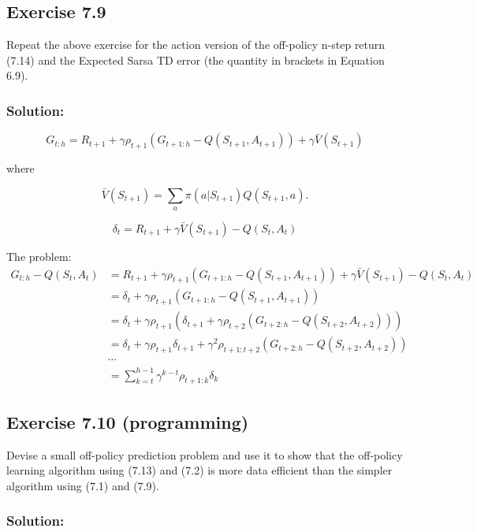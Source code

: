 \subsection*{Exercise 7.9}
Repeat the above exercise for the action version of the off-policy n-step
return (7.14) and the Expected Sarsa TD error (the quantity in brackets in Equation 6.9).

\subsubsection*{Solution:}

\[
    G_{t:h} = R_{t+1} + \gamma \rho_{t+1} \left( G_{t+1:h} - Q(S_{t+1}, A_{t+1}) \right) + \gamma \bar{V}(S_{t+1})
\]

where 

\[
    \bar{V}(S_{t+1}) = \sum_a \pi(a | S_{t+1}) Q(S_{t+1}, a).
\]

\[
    \delta_t = R_{t+1} + \gamma \bar{V}(S_{t+1}) - Q(S_t, A_t)
\]

The problem:
\begin{align*}
    G_{t:h} - Q(S_t, A_t) &= R_{t+1} + \gamma \rho_{t+1} \left( G_{t+1:h} - Q(S_{t+1}, A_{t+1}) \right) + \gamma \bar{V}(S_{t+1}) - Q(S_t, A_t) \\
    &= \delta_t + \gamma \rho_{t+1} \left( G_{t+1:h} - Q(S_{t+1}, A_{t+1}) \right) \\
    &= \delta_t + \gamma \rho_{t+1} \left( \delta_{t+1}  + \gamma \rho_{t+2} \left( G_{t+2:h} - Q(S_{t+2}, A_{t+2}) \right) \right) \\
    &= \delta_t + \gamma \rho_{t+1} \delta_{t+1} + \gamma^2 \rho_{t+1:t+2} \left( G_{t+2:h} - Q(S_{t+2}, A_{t+2}) \right) \\
    &\cdots \\
    &= \sum_{k=t}^{h-1} \gamma^{k-t} \rho_{t+1:k} \delta_k
\end{align*}



\subsection*{Exercise 7.10 (programming)}
Devise a small off-policy prediction problem and use it to
show that the off-policy learning algorithm using (7.13) and (7.2) is more data efficient
than the simpler algorithm using (7.1) and (7.9). 

\subsubsection*{Solution:}

